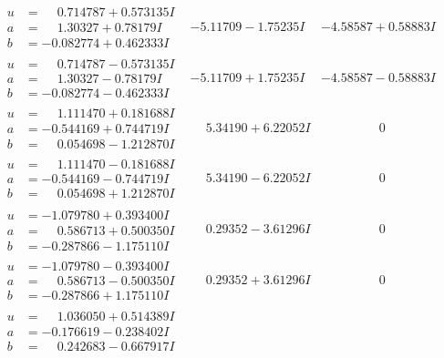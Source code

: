 \documentclass[1p]{elsarticle_modified}
\theoremstyle{definition}
\begin{document}
$$\begin{array}{c|c|c}
\begin{aligned}
u &= \phantom{-}0.714787 + 0.573135 I \\
a &= \phantom{-}1.30327 + 0.78179 I \\
b &= -0.082774 + 0.462333 I\end{aligned}
 & -5.11709 - 1.75235 I & -4.58587 + 0.58883 I \\ \hline\begin{aligned}
u &= \phantom{-}0.714787 - 0.573135 I \\
a &= \phantom{-}1.30327 - 0.78179 I \\
b &= -0.082774 - 0.462333 I\end{aligned}
 & -5.11709 + 1.75235 I & -4.58587 - 0.58883 I \\ \hline\begin{aligned}
u &= \phantom{-}1.111470 + 0.181688 I \\
a &= -0.544169 + 0.744719 I \\
b &= \phantom{-}0.054698 - 1.212870 I\end{aligned}
 & \phantom{-}5.34190 + 6.22052 I & \phantom{-0.000000 } 0 \\ \hline\begin{aligned}
u &= \phantom{-}1.111470 - 0.181688 I \\
a &= -0.544169 - 0.744719 I \\
b &= \phantom{-}0.054698 + 1.212870 I\end{aligned}
 & \phantom{-}5.34190 - 6.22052 I & \phantom{-0.000000 } 0 \\ \hline\begin{aligned}
u &= -1.079780 + 0.393400 I \\
a &= \phantom{-}0.586713 + 0.500350 I \\
b &= -0.287866 - 1.175110 I\end{aligned}
 & \phantom{-}0.29352 - 3.61296 I & \phantom{-0.000000 } 0 \\ \hline\begin{aligned}
u &= -1.079780 - 0.393400 I \\
a &= \phantom{-}0.586713 - 0.500350 I \\
b &= -0.287866 + 1.175110 I\end{aligned}
 & \phantom{-}0.29352 + 3.61296 I & \phantom{-0.000000 } 0 \\ \hline\begin{aligned}
u &= \phantom{-}1.036050 + 0.514389 I \\
a &= -0.176619 - 0.238402 I \\
b &= \phantom{-}0.242683 - 0.667917 I\end{aligned}

\end{array}$$
\end{document}
